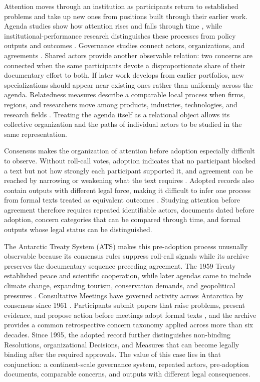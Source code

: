 \documentclass{fun_article}
\begin{document}
Attention moves through an institution as participants return to established problems and take up new ones from positions built through their earlier work. Agenda studies show how attention rises and falls through time \cite{BaumgartnerJones1993,JonesBaumgartner2005,GreenPedersenWalgrave2014}, while institutional-performance research distinguishes these processes from policy outputs and outcomes \cite{GutnerThompson2010,CoenEtAl2022}. Governance studies connect actors, organizations, and agreements \cite{BurchEtAl2019,Kim2013,Kim2020}. Shared actors provide another observable relation: two concerns are connected when the same participants devote a disproportionate share of their documentary effort to both. If later work develops from earlier portfolios, new specializations should appear near existing ones rather than uniformly across the agenda. Relatedness measures describe a comparable local process when firms, regions, and researchers move among products, industries, technologies, and research fields \cite{Hidalgo2007,Hidalgo2018,Neffke2011,Boschma2017,Guevara2016}. Treating the agenda itself as a relational object allows its collective organization and the paths of individual actors to be studied in the same representation.

Consensus makes the organization of attention before adoption especially difficult to observe. Without roll-call votes, adoption indicates that no participant blocked a text but not how strongly each participant supported it, and agreement can be reached by narrowing or weakening what the text requires \cite{Steinberg2002,Drubel2023HiddenContestation}. Adopted records also contain outputs with different legal force, making it difficult to infer one process from formal texts treated as equivalent outcomes \cite{AbbottSnidal2000}. Studying attention before agreement therefore requires repeated identifiable actors, documents dated before adoption, concern categories that can be compared through time, and formal outputs whose legal status can be distinguished.

The Antarctic Treaty System (ATS) makes this pre-adoption process unusually observable because its consensus rules suppress roll-call signals while its archive preserves the documentary sequence preceding agreement. The 1959 Treaty established peace and scientific cooperation, while later agendas came to include climate change, expanding tourism, conservation demands, and geopolitical pressures \cite{Carter2025,Luo2024AntarcticTourism,Dodds2019,AntarcticTreaty1959}. Consultative Meetings have governed activity across Antarctica by consensus since 1961 \cite{Joyner1998,Yao2021}. Participants submit papers that raise problems, present evidence, and propose action before meetings adopt formal texts \cite{Kennicutt2019,Sampaio2022}, and the archive provides a common retrospective concern taxonomy applied across more than six decades. Since 1995, the adopted record further distinguishes non-binding Resolutions, organizational Decisions, and Measures that can become legally binding after the required approvals. The value of this case lies in that conjunction: a continent-scale governance system, repeated actors, pre-adoption documents, comparable concerns, and outputs with different legal consequences.
\end{document}
